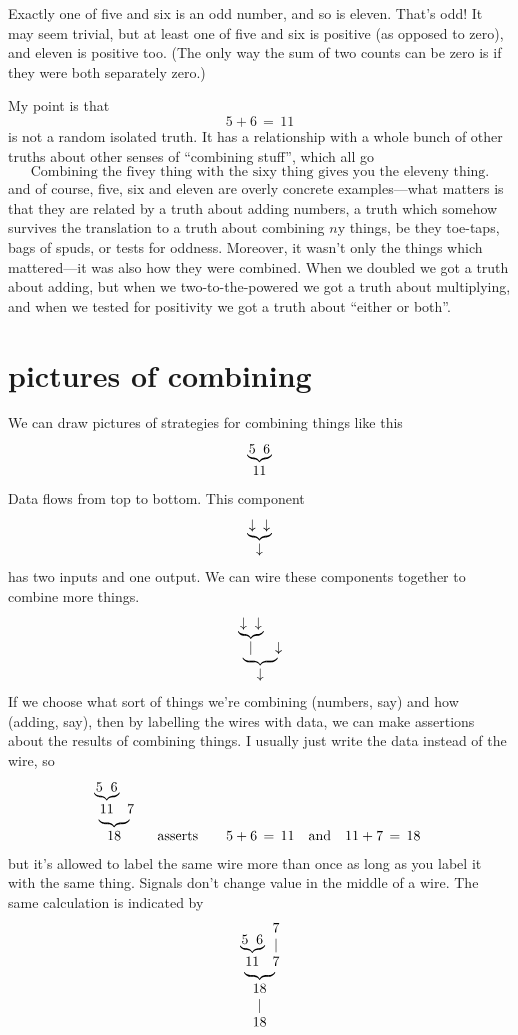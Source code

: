 \documentclass{book}
\begin{document}
Exactly one of five and six is an odd number, and so is eleven. That's odd! It may seem trivial, but at least one of five and six is positive (as opposed to zero), and eleven is positive too. (The only way the sum of two counts can be zero is if they were both separately zero.)

My point is that
\[
5 + 6 \,=\, 11
\]
is not a random isolated truth. It has a relationship with a whole bunch of other truths about other senses of ``combining stuff'', which all go
\[
\mbox{Combining the fivey thing with the sixy thing gives you the eleveny thing.}
\]
and of course, five, six and eleven are overly concrete examples---what matters is that they are related by a truth about adding numbers, a truth which somehow survives the translation to a truth about combining $n$y things, be they toe-taps, bags of spuds, or tests for oddness. Moreover, it wasn't only the things which mattered---it was also how they were combined. When we doubled we got a truth about adding, but when we two-to-the-powered we got a truth about multiplying, and when we tested for positivity we got a truth about ``either or both''.


\section{pictures of combining}

\newcommand{\wye}[3]{\begin{array}[b]{@{}c@{}}\underbrace{\!\!#1\;\;#2\!\!}\\ #3\end{array}}
\newcommand{\wir}[2]{\begin{array}[b]{@{}c@{}}#1\\ \mid\\ #2\end{array}}
\newcommand{\wid}[1]{\wir{#1}{#1}}
\newcommand{\naw}[1]{\begin{array}[b]{@{}c@{}}\bullet \vspace*{-0.13in}\\ \mid \\ #1\end{array}}

We can draw pictures of strategies for combining things like this
\[
\wye{5}{6}{11}
\]
Data flows from top to bottom. This component
\[
\wye\downarrow\downarrow\downarrow
\]
has two inputs and one output. We can wire these components together to combine more things.
\[
\wye{\wye\downarrow\downarrow\mid}\downarrow\downarrow
\]
If we choose what sort of things we're combining (numbers, say) and how (adding, say), then by labelling the wires with data, we can make assertions about the results of combining things. I usually just write the data instead of the wire, so
\[
\wye{\wye{5}{6}{11}}{7}{18}
\qquad\mbox{asserts}\qquad
5 + 6 \,=\, 11\quad\mbox{and}\quad 11 + 7 \,=\, 18
\]
but it's allowed to label the same wire more than once as long as you label it with the same thing. Signals don't change value in the middle of a wire. The same calculation is indicated by
\[
\wye{\wye{5}{6}{11}}{\wid{7}}{\wid{18}}
\]
\end{document}

